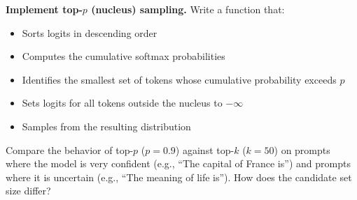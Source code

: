 \begin{problem}[5]
  \textbf{Implement top-$p$ (nucleus) sampling.} Write a function that:
  \begin{itemize}
    \item Sorts logits in descending order
    \item Computes the cumulative softmax probabilities
    \item Identifies the smallest set of tokens whose cumulative probability
          exceeds $p$
    \item Sets logits for all tokens outside the nucleus to $-\infty$
    \item Samples from the resulting distribution
  \end{itemize}
  Compare the behavior of top-$p$ ($p = 0.9$) against top-$k$ ($k = 50$) on
  prompts where the model is very confident (e.g., ``The capital of France is'')
  and prompts where it is uncertain (e.g., ``The meaning of life is''). How
  does the candidate set size differ?
\end{problem}